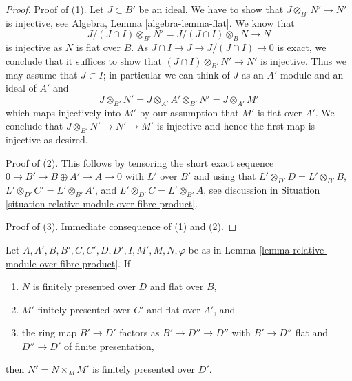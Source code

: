 \begin{proof}
Proof of (1). Let $J \subset B'$ be an ideal.
We have to show that $J \otimes_{B'} N' \to N'$
is injective, see Algebra, Lemma \ref{algebra-lemma-flat}. We know that
$$
J/(J \cap I) \otimes_{B'} N' = J/(J \cap I) \otimes_B N \to N
$$
is injective as $N$ is flat over $B$. As
$J \cap I \to J \to J/(J \cap I) \to 0$ is exact, we
conclude that it suffices to show that $(J \cap I) \otimes_{B'} N' \to N'$
is injective. Thus we may assume that $J \subset I$; in particular we can
think of $J$ as an $A'$-module and an ideal of $A'$ and
$$
J \otimes_{B'} N' = J \otimes_{A'} A' \otimes_{B'} N' =
J \otimes_{A'} M'
$$
which maps injectively into $M'$ by our assumption that $M'$ is flat
over $A'$. We conclude that $J \otimes_{B'} N' \to N' \to M'$ is injective
and hence the first map is injective as desired.

\medskip\noindent
Proof of (2). This follows by tensoring the short exact sequence
$0 \to B' \to B \oplus A' \to A \to 0$ with $L'$ over $B'$
and using that $L' \otimes_{D'} D = L' \otimes_{B'} B$,
$L' \otimes_{D'} C' = L' \otimes_{B'} A'$, and
$L' \otimes_{D'} C = L' \otimes_{B'} A$, see discussion in
Situation \ref{situation-relative-module-over-fibre-product}.

\medskip\noindent
Proof of (3). Immediate consequence of (1) and (2).
\end{proof}

\begin{lemma}
\label{lemma-relative-finitely-presented-module-over-fibre-product}
Let $A, A', B, B', C, C', D, D', I, M', M, N, \varphi$ be as in
Lemma \ref{lemma-relative-module-over-fibre-product}. If
\begin{enumerate}
\item $N$ is finitely presented over $D$ and flat over $B$,
\item $M'$ finitely presented over $C'$ and flat over $A'$, and
\item the ring map $B' \to D'$ factors as $B' \to D'' \to D''$
with $B' \to D''$ flat and $D'' \to D'$ of finite presentation,
\end{enumerate}
then $N' = N \times_M M'$ is finitely presented over $D'$.
\end{lemma}


